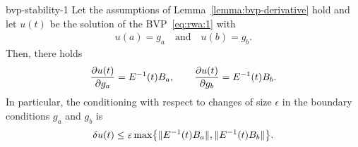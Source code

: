 \begin{Theorem}{bvp-stability-1}
  Let the assumptions of Lemma~\ref{lemma:bvp-derivative} hold and let
  $u(t)$ be the solution of the BVP~\eqref{eq:rwa:1} with
  \begin{gather*}
    u(a) = g_a\quad \text{and} \quad u(b) = g_b.
  \end{gather*}
  Then, there holds
  \begin{gather}
    \label{eq:rwa:20}
    \frac{\partial u(t)}{\partial g_a} = E^{-1}(t) B_a,
    \qquad
    \frac{\partial u(t)}{\partial g_b} = E^{-1}(t) B_b.
  \end{gather}
  In particular, the conditioning with respect to changes of size
  $\epsilon$ in the boundary conditions $g_a$ and $g_b$ is
  \begin{gather}
    \delta u(t) \le \varepsilon
    \max\bigl\{\lVert E^{-1}(t) B_a\rVert, \lVert E^{-1}(t)B_b\rVert\bigr\}.
  \end{gather}
\end{Theorem}
